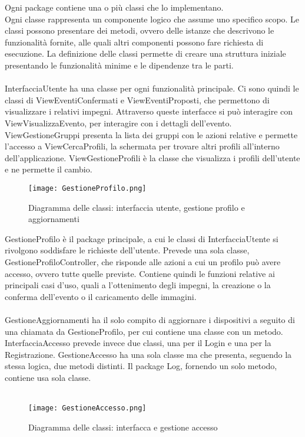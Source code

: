 Ogni package contiene una o più classi che lo implementano.\\
Ogni classe rappresenta un componente logico che assume uno specifico scopo.
Le classi possono presentare dei metodi, ovvero delle istanze che descrivono le funzionalità fornite,
alle quali altri componenti possono fare richiesta di esecuzione.
La definizione delle classi permette di creare una struttura iniziale
presentando le funzionalità minime e le dipendenze tra le parti.\\
\\
InterfacciaUtente ha una classe per ogni funzionalità principale.
Ci sono quindi le classi di ViewEventiConfermati e ViewEventiProposti, 
che permettono di visualizzare i relativi impegni.
Attraverso queste interfacce si può interagire con ViewVisualizzaEvento, 
per interagire con i dettagli dell'evento.
ViewGestioneGruppi presenta la lista dei gruppi con le azioni relative
e permette l'accesso a ViewCercaProfili, 
la schermata per trovare altri profili all'interno dell'applicazione.
ViewGestioneProfili è la classe che visualizza i profili dell'utente e ne permette il cambio.\\

\begin{figure}[h!]
    \begin{center}
        \texttt{[image: GestioneProfilo.png]}
        \caption{Diagramma delle classi: interfaccia utente, gestione profilo e aggiornamenti}
    \end{center}
\end{figure}

GestioneProfilo è il package principale, 
a cui le classi di InterfacciaUtente si rivolgono soddisfare le richieste dell'utente.
Prevede una sola classe, GestioneProfiloController,
che risponde alle azioni a cui un profilo può avere accesso, ovvero tutte quelle previste.
Contiene quindi le funzioni relative ai principali casi d'uso, 
quali a l'ottenimento degli impegni, la creazione o la conferma dell'evento o il caricamento delle immagini.\\
\\
GestioneAggiornamenti ha il solo compito di aggiornare i dispositivi a seguito di una chiamata da GestioneProfilo,
per cui contiene una classe con un metodo.
InterfacciaAccesso prevede invece due classi, una per il Login e una per la Registrazione.
GestioneAccesso ha una sola classe ma che presenta, seguendo la stessa logica, due metodi distinti.
Il package Log, fornendo un solo metodo, contiene usa sola classe.\\
\\
\begin{figure}[h!]
    \begin{center}
        \texttt{[image: GestioneAccesso.png]}
        \caption{Diagramma delle classi: interfacca e gestione accesso}
    \end{center}
\end{figure}



\clearpage